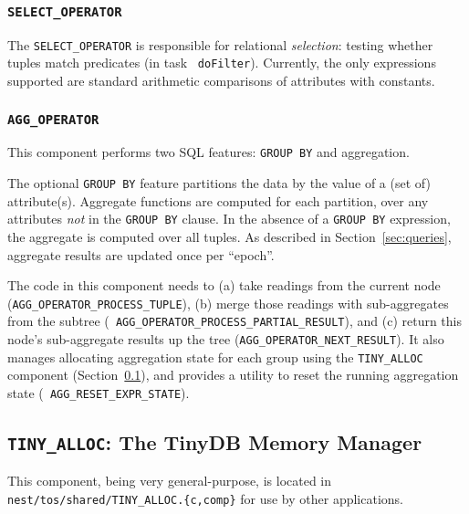 \documentclass[11pt]{article}
\begin{document}
\subsubsection {\tt SELECT\_OPERATOR}
The {\tt SELECT\_OPERATOR} is responsible for relational {\em
selection}: testing whether tuples match predicates (in task {\tt
doFilter}). Currently, the only expressions supported are standard
arithmetic comparisons of attributes with constants.

\subsubsection {\tt AGG\_OPERATOR}
This component performs two SQL features: {\tt GROUP BY} and
aggregation.

The optional {\tt GROUP BY} feature partitions the data by the value
of a (set of) attribute(s).  Aggregate functions are computed for each
partition, over any attributes {\em not} in the {\tt GROUP BY} clause.  In
the absence of a {\tt GROUP BY} expression, the aggregate is computed
over all tuples.  As described in Section~\ref{sec:queries}, aggregate
results are updated once per ``epoch''.

The code in this component needs to (a) take readings from the current
node ({\tt AGG\_OPERATOR\_PROCESS\_TUPLE}), (b) merge those readings
with sub-aggregates from the subtree ({\tt
AGG\_OPERATOR\_PROCESS\_PARTIAL\_RESULT}), and (c) return this node's
sub-aggregate results up the tree ({\tt AGG\_OPERATOR\_NEXT\_RESULT}).
It also manages allocating aggregation state for each group using the
{\tt TINY\_ALLOC} component (Section~\ref{sec:tinyalloc}), and
provides a utility to reset the running aggregation state ({\tt
AGG\_RESET\_EXPR\_STATE}).

\subsection {{\tt TINY\_ALLOC}: The TinyDB Memory Manager}
\label{sec:tinyalloc}
This component, being very general-purpose, is located in {\tt
nest/tos/shared/TINY\_ALLOC.\{c,comp\}} for use by other applications.
\end{document}
